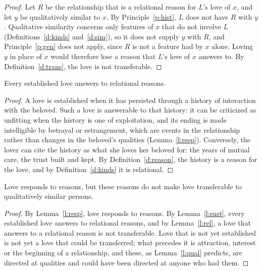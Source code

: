 \documentclass{situationist-preprint}
\begin{document}
\begin{proof}
Let $R$ be the relationship that is a relational reason for $L$'s love of $x$, and let $y$ be qualitatively similar to $x$. By Principle~\ref{p:hist}, $L$ does not have $R$ with $y$. Qualitative similarity concerns only features of $x$ that do not involve $L$ (Definitions~\ref{d:kinds} and~\ref{d:sim}), so it does not supply $y$ with $R$, and Principle~\ref{p:gen} does not apply, since $R$ is not a feature had by $x$ alone. Loving $y$ in place of $x$ would therefore lose a reason that $L$'s love of $x$ answers to. By Definition~\ref{d:trans}, the love is not transferable.
\end{proof}

\begin{lemma}\label{l:sust}
Every established love answers to relational reasons.
\end{lemma}

\begin{proof}
A love is established when it has persisted through a history of interaction with the beloved. Such a love is answerable to that history: it can be criticized as unfitting when the history is one of exploitation, and its ending is made intelligible by betrayal or estrangement, which are events in the relationship rather than changes in the beloved's qualities (Lemma~\ref{l:resp}). Conversely, the lover can cite the history as what she loves her beloved for: the years of mutual care, the trust built and kept. By Definition~\ref{d:reason}, the history is a reason for the love, and by Definition~\ref{d:kinds} it is relational.
\end{proof}

\begin{theorem}\label{t:main}
Love responds to reasons, but these reasons do not make love transferable to qualitatively similar persons.
\end{theorem}

\begin{proof}
By Lemma~\ref{l:resp}, love responds to reasons. By Lemma~\ref{l:sust}, every established love answers to relational reasons, and by Lemma~\ref{l:rel}, a love that answers to a relational reason is not transferable. Love that is not yet established is not yet a love that could be transferred; what precedes it is attraction, interest or the beginning of a relationship, and these, as Lemma~\ref{l:qual} predicts, are directed at qualities and could have been directed at anyone who had them.
\end{proof}
\end{document}
